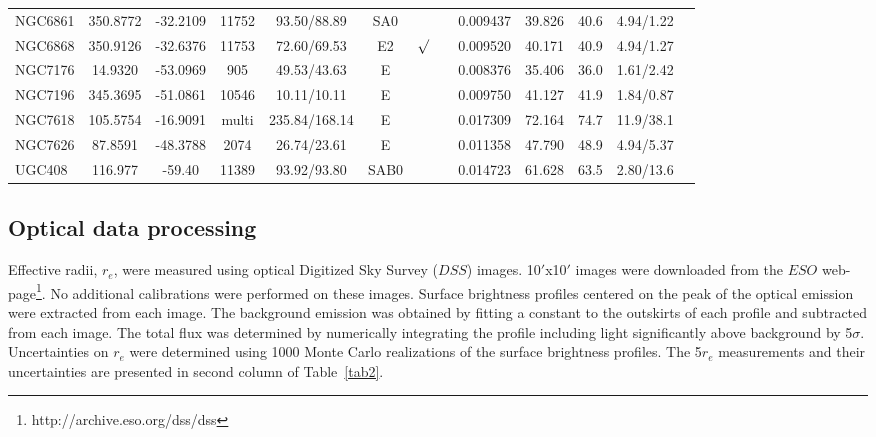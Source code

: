 \documentclass[iop]{emulateapj}
\begin{document}
\begin{table}
\begin{tabular}{lcccccccccccc}
NGC6861 & 350.8772 & -32.2109 & 11752 & 93.50/88.89 & SA0 &    &    & 0.009437 & 39.826 & 40.6 & 4.94/1.22  \\
NGC6868 & 350.9126 & -32.6376 & 11753 & 72.60/69.53 & E2  & $\surd$& & 0.009520 & 40.171 & 40.9 & 4.94/1.27  \\
NGC7176 & 14.9320 & -53.0969 & 905 & 49.53/43.63 & E &     &       & 0.008376 & 35.406 & 36.0 & 1.61/2.42  \\
NGC7196 & 345.3695 & -51.0861 & 10546 & 10.11/10.11 & E &   &      & 0.009750 & 41.127 & 41.9 & 1.84/0.87  \\ 
NGC7618 & 105.5754 & -16.9091 & multi & 235.84/168.14 & E  &  &       & 0.017309 & 72.164 & 74.7  & 11.9/38.1   \\
NGC7626 & 87.8591 & -48.3788 & 2074 & 26.74/23.61 & E &   &    & 0.011358 & 47.790 & 48.9 & 4.94/5.37  \\
UGC408  & 116.977 & -59.40 & 11389 & 93.92/93.80 & SAB0 & & & 0.014723 & 61.628 & 63.5 & 2.80/13.6  \\
\hline
\end{tabular} 
\end{table}

\subsection{Optical data processing}\label{subsec_opt}

Effective radii, $r_e$, were measured using optical Digitized Sky Survey ($DSS$) images. 10$'$x10$'$ images were downloaded from the $ESO$ web-page\footnote{http://archive.eso.org/dss/dss}. No additional calibrations were performed on these images.  Surface brightness profiles centered on the peak of the optical emission were extracted from each image. The background emission was obtained by fitting a constant to the outskirts of each profile and subtracted from each image. The total flux was determined by numerically integrating the profile including light significantly above background by 5$\sigma$. Uncertainties on $r_e$ were determined using 1000 Monte Carlo realizations of the surface brightness profiles. The 5$r_e$ measurements and their uncertainties are presented in second column of Table~\ref{tab2}. 
\end{document}
